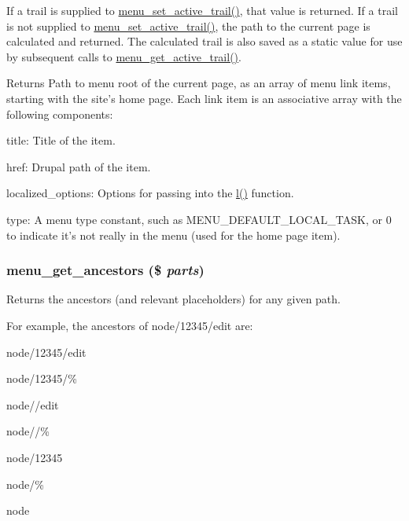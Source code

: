 If a trail is supplied to \hyperlink{group__menu_ga9328a9a4f297d8bb095d924e75a8abd7}{menu\_\-set\_\-active\_\-trail()}, that value is returned. If a trail is not supplied to \hyperlink{group__menu_ga9328a9a4f297d8bb095d924e75a8abd7}{menu\_\-set\_\-active\_\-trail()}, the path to the current page is calculated and returned. The calculated trail is also saved as a static value for use by subsequent calls to \hyperlink{group__menu_ga55105d602c5c5ea5b39aae25aa47f8c5}{menu\_\-get\_\-active\_\-trail()}.

\begin{DoxyReturn}{Returns}
Path to menu root of the current page, as an array of menu link items, starting with the site's home page. Each link item is an associative array with the following components:
\begin{DoxyItemize}
\item title: Title of the item.
\item href: Drupal path of the item.
\item localized\_\-options: Options for passing into the \hyperlink{common_8inc_ad3b36c06dc46250b8d22b8d0d2e7bd97}{l()} function.
\item type: A menu type constant, such as MENU\_\-DEFAULT\_\-LOCAL\_\-TASK, or 0 to indicate it's not really in the menu (used for the home page item). 
\end{DoxyItemize}
\end{DoxyReturn}
\hypertarget{group__menu_ga24ddfa75da5f03482a2df2c9c8d1f711}{
\subsubsection[{menu\_\-get\_\-ancestors}]{\setlength{\rightskip}{0pt plus 5cm}menu\_\-get\_\-ancestors (\$ {\em parts})}}
\label{group__menu_ga24ddfa75da5f03482a2df2c9c8d1f711}
Returns the ancestors (and relevant placeholders) for any given path.

For example, the ancestors of node/12345/edit are:
\begin{DoxyItemize}
\item node/12345/edit
\item node/12345/\%
\item node//edit
\item node//\%
\item node/12345
\item node/\%
\item node
\end{DoxyItemize}

